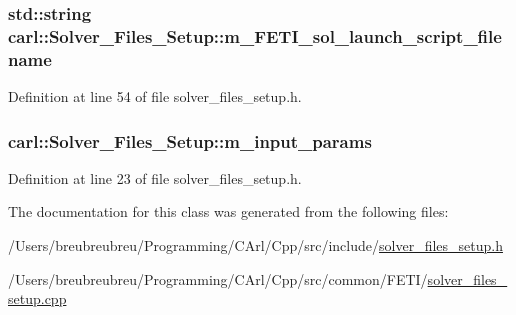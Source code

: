 \subsubsection[{m\+\_\+\+F\+E\+T\+I\+\_\+sol\+\_\+launch\+\_\+script\+\_\+filename}]{\setlength{\rightskip}{0pt plus 5cm}std\+::string carl\+::\+Solver\+\_\+\+Files\+\_\+\+Setup\+::m\+\_\+\+F\+E\+T\+I\+\_\+sol\+\_\+launch\+\_\+script\+\_\+filename\hspace{0.3cm}{\ttfamily [protected]}}\label{classcarl_1_1_solver___files___setup_a79c7bb3275ef8c1aee1e6dc857c0b0ea}


Definition at line 54 of file solver\+\_\+files\+\_\+setup.\+h.

\hypertarget{classcarl_1_1_solver___files___setup_aa5804bf6c6e506b382766333f232d3d5}{}
\subsubsection[{m\+\_\+input\+\_\+params}]{ carl\+::\+Solver\+\_\+\+Files\+\_\+\+Setup\+::m\+\_\+input\+\_\+params\hspace{0.3cm}{\ttfamily [protected]}}\label{classcarl_1_1_solver___files___setup_aa5804bf6c6e506b382766333f232d3d5}


Definition at line 23 of file solver\+\_\+files\+\_\+setup.\+h.



The documentation for this class was generated from the following files\+:\begin{DoxyCompactItemize}
\item 
/\+Users/breubreubreu/\+Programming/\+C\+Arl/\+Cpp/src/include/\hyperlink{solver__files__setup_8h}{solver\+\_\+files\+\_\+setup.\+h}\item 
/\+Users/breubreubreu/\+Programming/\+C\+Arl/\+Cpp/src/common/\+F\+E\+T\+I/\hyperlink{solver__files__setup_8cpp}{solver\+\_\+files\+\_\+setup.\+cpp}\end{DoxyCompactItemize}
